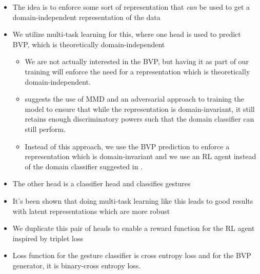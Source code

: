 \begin{itemize}
	\item The idea is to enforce some sort of representation that \textit{can} be used to get a domain-independent representation of the data
	\item We utilize multi-task learning for this, where one head is used to predict BVP, which is theoretically domain-independent \cite{zheng2019zero}
	\begin{itemize}
		\item We are not actually interested in the BVP, but having it as part of our training will enforce the need for a representation which is theoretically domain-independent.
		\item \cite{martini2021domain} suggests the use of MMD and an adversarial approach to training the model to ensure that while the representation is domain-invariant, it still retains enough discriminatory powers such that the domain classifier can still perform.
		\item Instead of this approach, we use the BVP prediction to enforce a representation which is domain-invariant and we use an RL agent instead of the domain classifier suggested in \cite{martini2021domain}.
	\end{itemize}
	\item The other head is a classifier head and classifies gestures
	\item It's been shown that doing multi-task learning like this leads to good results with latent representations which are more robust \cite{tuggener2021deepscoresv2}
	\item We duplicate this pair of heads to enable a reward function for the RL agent inspired by triplet loss
	\item Loss function for the gesture classifier is cross entropy loss and for the BVP generator, it is binary-cross entropy loss.
\end{itemize}
